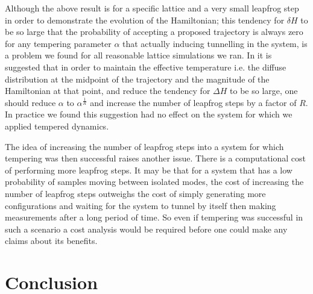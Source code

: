 \documentclass[12pt]{article}
\begin{document}
Although the above result is for a specific lattice and a very small leapfrog step in order to demonstrate the evolution of the Hamiltonian; this tendency for $\delta H$ to be so large that the probability of accepting a proposed trajectory is always zero for any tempering parameter $\alpha$ that actually inducing tunnelling in the system, is a problem we found for all reasonable lattice simulations we ran. In \cite{neal_2011} it is suggested that in order to maintain the effective temperature i.e. the diffuse distribution at the midpoint of the trajectory and the magnitude of the Hamiltonian at that point, and reduce the tendency for $\Delta H$ to be so large, one should reduce $\alpha$ to $\alpha^{\frac{1}{R}}$ and increase the number of leapfrog steps by a factor of $R$. In practice we found this suggestion had no effect on the system for which we applied tempered dynamics. 

The idea of increasing the number of leapfrog steps into a system for which tempering was then successful raises another issue. There is a computational cost of performing more leapfrog steps. It may be that for a system that has a low probability of samples moving between isolated modes, the cost of increasing the number of leapfrog steps outweighs the cost of simply generating more configurations and waiting for the system to tunnel by itself then making measurements after a long period of time. So even if tempering was successful in such a scenario a cost analysis would be required before one could make any claims about its benefits. 






\section{Conclusion}






\appendix
\end{document}
